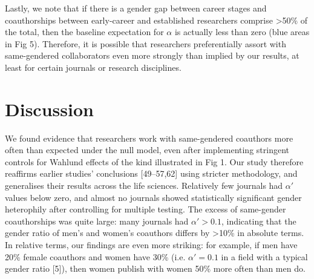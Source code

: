 \documentclass[12pt,]{article}
\begin{document}
Lastly, we note that if there is a gender gap between career stages and
coauthorships between early-career and established researchers comprise
\textgreater{}50\% of the total, then the baseline expectation for
\(\alpha\) is actually less than zero (blue areas in Fig 5). Therefore,
it is possible that researchers preferentially assort with same-gendered
collaborators even more strongly than implied by our results, at least
for certain journals or research disciplines.

\hypertarget{discussion}{%
\section{Discussion}\label{discussion}}

We found evidence that researchers work with same-gendered coauthors
more often than expected under the null model, even after implementing
stringent controls for Wahlund effects of the kind illustrated in Fig 1.
Our study therefore reaffirms earlier studies' conclusions
{[}49--57,62{]} using stricter methodology, and generalises their
results across the life sciences. Relatively few journals had
\(\alpha'\) values below zero, and almost no journals showed
statistically significant gender heterophily after controlling for
multiple testing. The excess of same-gender coauthorships was quite
large: many journals had \(\alpha' > 0.1\), indicating that the gender
ratio of men's and women's coauthors differs by \textgreater{}10\% in
absolute terms. In relative terms, our findings are even more striking:
for example, if men have 20\% female coauthors and women have 30\% (i.e.
\(\alpha' = 0.1\) in a field with a typical gender ratio {[}5{]}), then
women publish with women 50\% more often than men do.
\end{document}
